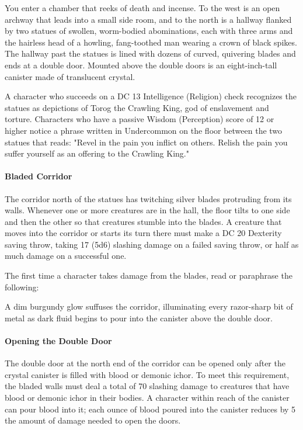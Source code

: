 \documentclass[a4paper, 11pt, bg=full, twocolumn, nooutline]{dndbook}
\begin{document}
\begin{DndReadAloud}
You enter a chamber that reeks of death and incense. To the west is an open archway that leads into a small side room, and to the north is a hallway flanked by two statues of swollen, worm-bodied abominations, each with three arms and the hairless head of a howling, fang-toothed man wearing a crown of black spikes.
The hallway past the statues is lined with dozens of curved, quivering blades and ends at a double door. Mounted above the double doors is an eight-inch-tall canister made of translucent crystal.
\end{DndReadAloud}

A character who succeeds on a DC 13 Intelligence (Religion) check recognizes the statues as depictions of Torog the Crawling King, god of enslavement and torture. Characters who have a passive Wisdom (Perception) score of 12 or higher notice a phrase written in Undercommon on the floor between the two statues that reads: "Revel in the pain you inflict on others. Relish the pain you suffer yourself as an offering to the Crawling King."

\paragraph{Bladed Corridor}

The corridor north of the statues has twitching silver blades protruding from its walls. Whenever one or more creatures are in the hall, the floor tilts to one side and then the other so that creatures stumble into the blades. A creature that moves into the corridor or starts its turn there must make a DC 20 Dexterity saving throw, taking 17 (5d6) slashing damage on a failed saving throw, or half as much damage on a successful one.

The first time a character takes damage from the blades, read or paraphrase the following:

\begin{DndReadAloud}
A dim burgundy glow suffuses the corridor, illuminating every razor-sharp bit of metal as dark fluid begins to pour into the canister above the double door.
\end{DndReadAloud}

\paragraph{Opening the Double Door}

The double door at the north end of the corridor can be opened only after the crystal canister is filled with blood or demonic ichor. To meet this requirement, the bladed walls must deal a total of 70 slashing damage to creatures that have blood or demonic ichor in their bodies. A character within reach of the canister can pour blood into it; each ounce of blood poured into the canister reduces by 5 the amount of damage needed to open the doors.
\end{document}
